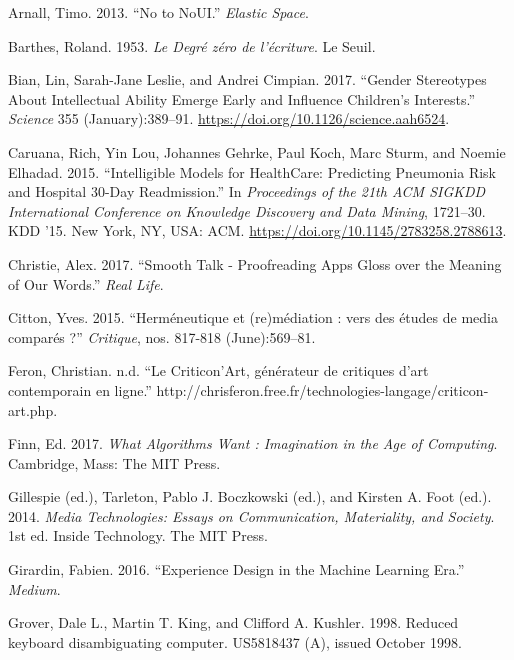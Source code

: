 \documentclass[]{article}
\begin{document}
\leavevmode\hypertarget{ref-Arnall2013}{}%
Arnall, Timo. 2013. ``No to NoUI.'' \emph{Elastic Space}.

\leavevmode\hypertarget{ref-Barthes1953}{}%
Barthes, Roland. 1953. \emph{Le Degré zéro de l'écriture}. Le Seuil.

\leavevmode\hypertarget{ref-Bian2017}{}%
Bian, Lin, Sarah-Jane Leslie, and Andrei Cimpian. 2017. ``Gender
Stereotypes About Intellectual Ability Emerge Early and Influence
Children's Interests.'' \emph{Science} 355 (January):389--91.
\url{https://doi.org/10.1126/science.aah6524}.

\leavevmode\hypertarget{ref-Caruana2015}{}%
Caruana, Rich, Yin Lou, Johannes Gehrke, Paul Koch, Marc Sturm, and
Noemie Elhadad. 2015. ``Intelligible Models for HealthCare: Predicting
Pneumonia Risk and Hospital 30-Day Readmission.'' In \emph{Proceedings
of the 21th ACM SIGKDD International Conference on Knowledge Discovery
and Data Mining}, 1721--30. KDD '15. New York, NY, USA: ACM.
\url{https://doi.org/10.1145/2783258.2788613}.

\leavevmode\hypertarget{ref-Christie2017}{}%
Christie, Alex. 2017. ``Smooth Talk - Proofreading Apps Gloss over the
Meaning of Our Words.'' \emph{Real Life}.

\leavevmode\hypertarget{ref-Citton2015}{}%
Citton, Yves. 2015. ``Herméneutique et (re)médiation : vers des études
de media comparés ?'' \emph{Critique}, nos. 817-818 (June):569--81.

\leavevmode\hypertarget{ref-Feron}{}%
Feron, Christian. n.d. ``Le Criticon'Art, générateur de critiques d'art
contemporain en ligne.''
http://chrisferon.free.fr/technologies-langage/criticon-art.php.

\leavevmode\hypertarget{ref-Finn2017}{}%
Finn, Ed. 2017. \emph{What Algorithms Want : Imagination in the Age of
Computing}. Cambridge, Mass: The MIT Press.

\leavevmode\hypertarget{ref-Gillespieed.2014}{}%
Gillespie (ed.), Tarleton, Pablo J. Boczkowski (ed.), and Kirsten A.
Foot (ed.). 2014. \emph{Media Technologies: Essays on Communication,
Materiality, and Society}. 1st ed. Inside Technology. The MIT Press.

\leavevmode\hypertarget{ref-Girardin2016}{}%
Girardin, Fabien. 2016. ``Experience Design in the Machine Learning
Era.'' \emph{Medium}.

\leavevmode\hypertarget{ref-Grover1998}{}%
Grover, Dale L., Martin T. King, and Clifford A. Kushler. 1998. Reduced
keyboard disambiguating computer. US5818437 (A), issued October 1998.
\end{document}
